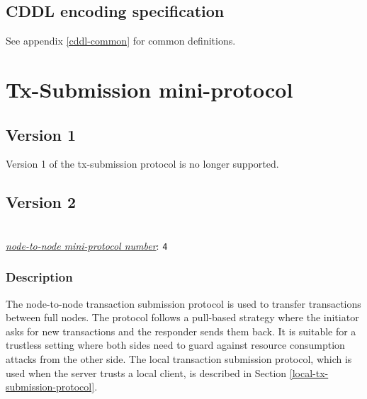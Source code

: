 \subsection{CDDL encoding specification}

See appendix \ref{cddl-common} for common definitions.

\section{Tx-Submission mini-protocol}
\label{tx-submission-protocol}
\subsection{Version 1}
Version 1 of the tx-submission protocol is no longer supported.

\subsection{Version 2}
\\
\hyperref[table:node-to-node-protocol-numbers]{\textit{node-to-node mini-protocol number}}: \texttt{4}\\
\label{tx-submission-protocol2}
\newcommand{\StInit}  {\state{StInit}}
\newcommand{\MsgInit} {\trans{MsgInit}}
\newcommand{\StTxIdsBlocking}    {\state{StTxIdsBlocking}}
\newcommand{\StTxIdsNonBlocking} {\state{StTxIdsNonBlocking}}
\newcommand{\StTxs}              {\state{StTxs}}
\newcommand{\MsgRequestTxIdsNB}  {\trans{MsgRequestTxIdsNonBlocking}}
\newcommand{\MsgRequestTxIdsB}   {\trans{MsgRequestTxIdsBlocking}}
\newcommand{\MsgReplyTxIds}      {\trans{MsgReplyTxIds}}
\newcommand{\MsgRequestTxs}      {\trans{MsgRequestTxs}}
\newcommand{\MsgReplyTxs}        {\trans{MsgReplyTxs}}

\subsubsection{Description}
The node-to-node transaction submission protocol is used to transfer
transactions between full nodes.  The protocol follows a pull-based strategy
where the initiator asks for new transactions and the responder sends them
back.  It is suitable for a trustless setting where both sides need to guard
against resource consumption attacks from the other side.  The local
transaction submission protocol, which is used when the server trusts a local
client, is described in Section \ref{local-tx-submission-protocol}.

